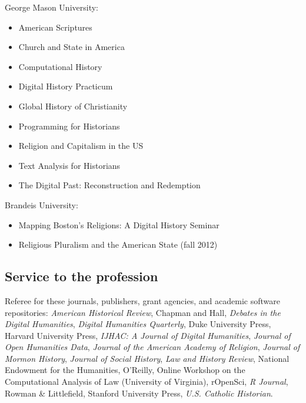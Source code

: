 \documentclass[11pt]{article}
\providecommand{\tightlist}{%
  \setlength{\itemsep}{0pt}\setlength{\parskip}{0pt}}
\begin{document}
George Mason University:

\vspace{-0.15in}

\begin{itemize}
    \tightlist
  \item American Scriptures 
  \item Church and State in America
  \item Computational History 
  \item Digital History Practicum
  \item Global History of Christianity 
  \item Programming for Historians 
  \item Religion and Capitalism in the US 
  \item Text Analysis for Historians 
  \item The Digital Past: Reconstruction and Redemption
\end{itemize}

\vspace{-0.1in}

Brandeis University:

\vspace{-0.15in}

\begin{itemize}
    \tightlist
  \item
    Mapping Boston's Religions: A Digital History Seminar 
  \item
    Religious Pluralism and the American State (fall 2012)
\end{itemize}

\subsection{Service to the profession}\label{Service to the profession}

Referee for these journals, publishers, grant agencies, and academic software 
repositories: \emph{American Historical Review}, Chapman and Hall, \emph{Debates 
in the Digital Humanities}, \emph{Digital Humanities Quarterly}, Duke University 
Press, Harvard University Press, \emph{IJHAC: A Journal of Digital Humanities}, 
\emph{Journal of Open Humanities Data}, \emph{Journal of the American Academy of 
Religion}, \emph{Journal of Mormon History}, \emph{Journal of Social History}, 
\emph{Law and History Review}, National Endowment for the Humanities, O'Reilly, 
Online Workshop on the Computational Analysis of Law (University of Virginia),
rOpenSci, \emph{R Journal}, Rowman \& Littlefield, Stanford University Press,
\emph{U.S. Catholic Historian}.
\end{document}

